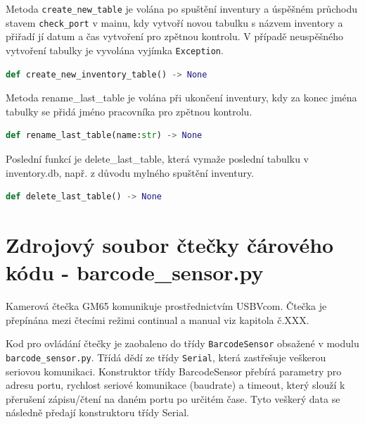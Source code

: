 Metoda \texttt{create\_new\_table} je volána po spuštění inventury a úspěšném průchodu stavem \texttt{check\_port} v mainu, kdy vytvoří novou tabulku s názvem inventory a přiřadí jí datum a čas vytvoření pro zpětnou kontrolu. V případě neuspěšného vytvoření tabulky je vyvolána vyjímka \texttt{Exception}.
\begin{lstlisting}[language=Python,breaklines=false, frame=single]
def create_new_inventory_table() -> None
\end{lstlisting}
\bigskip
Metoda rename\_last\_table je volána při ukončení inventury, kdy za konec jména tabulky se přidá jméno pracovníka pro zpětnou kontrolu.
\begin{lstlisting}[language=Python,breaklines=false, frame=single]
def rename_last_table(name:str) -> None
\end{lstlisting}
\bigskip
Poslední funkcí je delete\_last\_table, která vymaže poslední tabulku v inventory.db, např. z důvodu mylného spuštění inventury.
\begin{lstlisting}[language=Python,breaklines=false, frame=single]
def delete_last_table() -> None
\end{lstlisting}

%




\section{Zdrojový soubor čtečky čárového kódu - barcode\_sensor.py}
Kamerová čtečka GM65 komunikuje prostřednictvím USBVcom. Čtečka je přepínána mezi čtecími režimi continual a manual viz kapitola č.XXX. 

Kod pro ovládání čtečky je zaobaleno do třídy \texttt{BarcodeSensor} obsažené v modulu \texttt{barcode\_sensor.py}. Třídá dědí ze třídy \texttt{Serial}, která zastřešuje veškerou seriovou komunikaci. Konstruktor třídy BarcodeSensor přebírá parametry pro adresu portu, rychlost seriové komunikace (baudrate) a timeout, který slouží k přerušení zápisu/čtení na daném portu po určitém čase. Tyto veškerý data se následně předají konstruktoru třídy Serial. 

